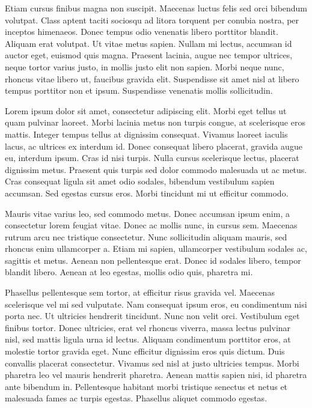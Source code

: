 Etiam cursus finibus magna non suscipit. Maecenas luctus felis sed orci bibendum volutpat. Class aptent taciti sociosqu ad litora torquent per conubia nostra, per inceptos himenaeos. Donec tempus odio venenatis libero porttitor blandit. Aliquam erat volutpat. Ut vitae metus sapien. \cite{balogh2013codemetropolisBase} Nullam mi lectus, accumsan id auctor eget, euismod quis magna. Praesent lacinia, augue nec tempor ultrices, neque tortor varius justo, in mollis justo elit non sapien. Morbi neque nunc, rhoncus vitae libero ut, faucibus gravida elit. \cite{balogh2012SSBSE} Suspendisse sit amet nisl at libero tempus porttitor non et ipsum. Suspendisse venenatis mollis sollicitudin.

Lorem ipsum dolor sit amet, consectetur adipiscing elit. Morbi eget tellus ut quam pulvinar laoreet. Morbi lacinia metus non turpis congue, at scelerisque eros mattis. Integer tempus tellus at dignissim consequat. Vivamus laoreet iaculis lacus, ac ultrices ex interdum id. Donec consequat libero placerat, gravida augue eu, interdum ipsum. Cras id nisi turpis. Nulla cursus scelerisque lectus, placerat dignissim metus. Praesent quis turpis sed dolor commodo malesuada ut ac metus. Cras consequat ligula sit amet odio sodales, bibendum vestibulum sapien accumsan. Sed egestas cursus eros. Morbi tincidunt mi ut efficitur commodo.

Mauris vitae varius leo, sed commodo metus. Donec accumsan ipsum enim, a consectetur lorem feugiat vitae. Donec ac mollis nunc, in cursus sem. Maecenas rutrum arcu nec tristique consectetur. Nunc sollicitudin aliquam mauris, sed rhoncus enim ullamcorper a. Etiam mi sapien, ullamcorper vestibulum sodales ac, sagittis et metus. Aenean non pellentesque erat. Donec id sodales libero, tempor blandit libero. Aenean at leo egestas, mollis odio quis, pharetra mi.

Phasellus pellentesque sem tortor, at efficitur risus gravida vel. Maecenas scelerisque vel mi sed vulputate. Nam consequat ipsum eros, eu condimentum nisi porta nec. Ut ultricies hendrerit tincidunt. Nunc non velit orci. Vestibulum eget finibus tortor. Donec ultricies, erat vel rhoncus viverra, massa lectus pulvinar nisl, sed mattis ligula urna id lectus. \cite{balogh2012prediction} Aliquam condimentum porttitor eros, at molestie tortor gravida eget. Nunc efficitur dignissim eros quis dictum. Duis convallis placerat consectetur. Vivamus sed nisl at justo ultricies tempus. Morbi pharetra leo vel mauris hendrerit pharetra. Aenean mattis sapien nisi, id pharetra ante bibendum in. Pellentesque habitant morbi tristique senectus et netus et malesuada fames ac turpis egestas. Phasellus aliquet commodo egestas.